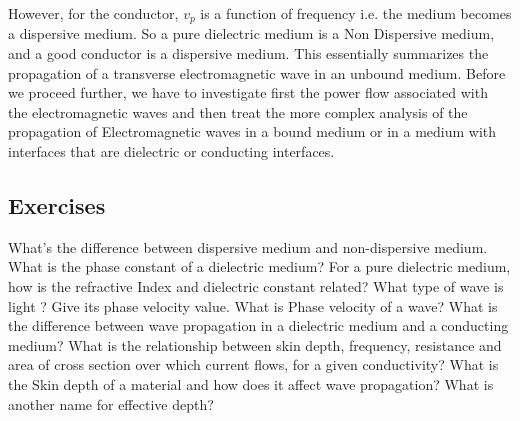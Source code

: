 However, for the conductor, $v_p$ is a function of frequency i.e. the medium becomes a dispersive medium. So a pure dielectric medium is a Non Dispersive medium, and a good conductor is a dispersive medium. This essentially summarizes the propagation of a transverse electromagnetic wave in an unbound medium. Before we proceed further, we have to investigate first the power flow associated with the electromagnetic waves and then treat the more complex analysis of the propagation of Electromagnetic waves in a bound medium or in a medium with interfaces that are dielectric or conducting interfaces.
\begin{mdframed}[backgroundcolor=lightblue, linewidth=1pt,  hidealllines=true]
\section{Exercises}
\begin{ExerciseList}
	\Exercise[label={ex12}] What's the difference between dispersive medium and non-dispersive medium.
	\Exercise[label={ex14}] What is the phase constant of a dielectric medium?
	\Exercise[label={ex15}] For a pure dielectric medium, how is the refractive Index and dielectric constant related?
	\Exercise[label={ex16}] What type of wave is light ? Give its phase velocity value.
	\Exercise[label={ex17}] What is Phase velocity of a wave?
	\Exercise[label={ex18}] What is the difference between wave propagation in a dielectric medium and a conducting medium?
	\Exercise[label={ex19}] What is the relationship between skin depth, frequency, resistance and area of cross section over which current flows, for a given conductivity?
	\Exercise[label={ex20}] What is the Skin depth of a material and how does it affect wave propagation?
	\Exercise[label={ex21}] What is another name for effective depth?
\end{ExerciseList}
\end{mdframed}
